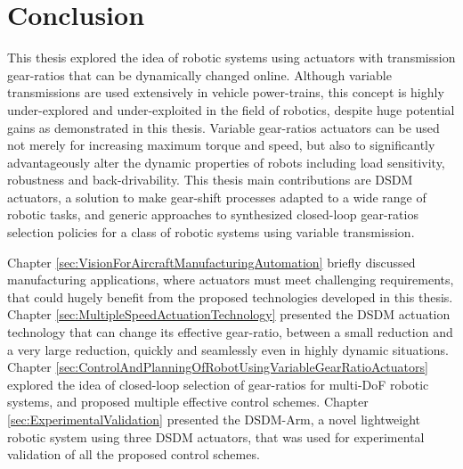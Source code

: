 \chapter{Conclusion}
\label{sec:Conclusion}








This thesis explored the idea of robotic systems using actuators with transmission gear-ratios that can be dynamically changed online. Although variable transmissions are used extensively in vehicle power-trains, this concept is highly under-explored and under-exploited in the field of robotics, despite huge potential gains as demonstrated in this thesis. Variable gear-ratios actuators can be used not merely for increasing maximum torque and speed, but also to significantly advantageously alter the dynamic properties of robots including load sensitivity, robustness and back-drivability. This thesis main contributions are DSDM actuators, a solution to make gear-shift processes adapted to a wide range of robotic tasks, and generic approaches to synthesized closed-loop gear-ratios selection policies for a class of robotic systems using variable transmission.

%
Chapter \ref{sec:VisionForAircraftManufacturingAutomation} briefly discussed manufacturing applications, where actuators must meet challenging requirements, that could hugely benefit from the proposed technologies developed in this thesis. 
%
Chapter \ref{sec:MultipleSpeedActuationTechnology} presented the DSDM actuation technology that can change its effective gear-ratio, between a small reduction and a very large reduction, quickly and seamlessly even in highly dynamic situations. 
%
Chapter \ref{sec:ControlAndPlanningOfRobotUsingVariableGearRatioActuators} explored the idea of closed-loop selection of gear-ratios for multi-DoF robotic systems, and proposed multiple effective control schemes.
%
Chapter \ref{sec:ExperimentalValidation} presented the DSDM-Arm, a novel lightweight robotic system using three DSDM actuators, that was used for experimental validation of all the proposed control schemes. %


